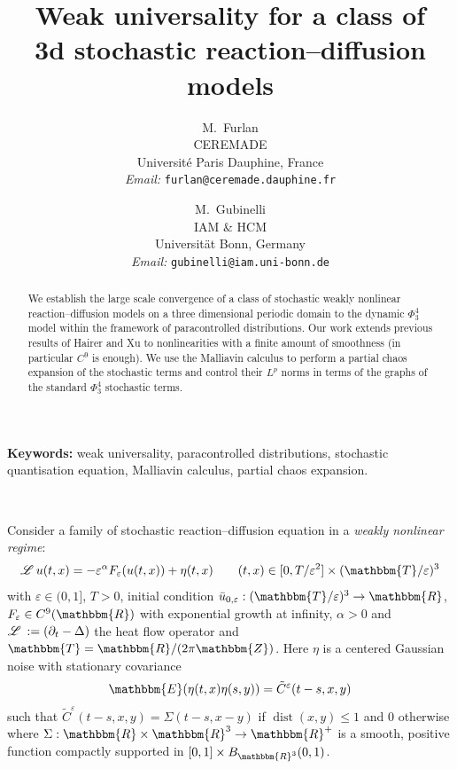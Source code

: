 \documentclass[a4paper,11pt]{article}
\newcommand{\tmaffiliation}[1]{\\ #1}
\newcommand{\tmemail}[1]{\\ \textit{Email:} \texttt{#1}}
\newcommand{\tmmathbf}[1]{\ensuremath{\boldsymbol{#1}}}
\newcommand{\tmop}[1]{\ensuremath{\operatorname{#1}}}
\newcommand{\tmtextit}[1]{{\itshape{#1}}}
\newcommand{\tmkeywords}{\textbf{Keywords:} }
\newcommand{\LL}{\mathscr{L} \hspace{.2em}}
\begin{document}
\title{
  Weak universality for a class of\\
  3d stochastic reaction--diffusion models
}

\author{
  M.~Furlan
  \tmaffiliation{CEREMADE\\
  Universit{\'e} Paris Dauphine, France}
  \tmemail{furlan@ceremade.dauphine.fr}
  \and
  M.~Gubinelli
  \tmaffiliation{IAM \& HCM\\
  Universit{\"a}t Bonn, Germany}
  \tmemail{gubinelli@iam.uni-bonn.de}
}

\maketitle

\begin{abstract}
  We establish the large scale convergence of a class of stochastic weakly
  nonlinear reaction--diffusion models on a three dimensional periodic domain
  to the dynamic $\Phi^4_3$ model within the framework of paracontrolled
  distributions. Our work extends previous results of Hairer and Xu to
  nonlinearities with a finite amount of smoothness (in particular $C^9$ is
  enough). We use the Malliavin calculus to perform a partial chaos expansion
  of the stochastic terms and control their $L^p$ norms in terms of the graphs
  of the standard $\Phi^4_3$ stochastic terms. 
\end{abstract}

\tmkeywords{weak universality, paracontrolled distributions, stochastic
quantisation equation, Malliavin calculus, partial chaos expansion.}

\

Consider a family of stochastic reaction--diffusion equation in a
\tmtextit{weakly nonlinear regime}:
\begin{equation}
  \LL u (t, x) = - \varepsilon^{\alpha} F_{\varepsilon} (u (t, x)) + \eta (t,
  x) \label{e:micro} \qquad (t, x) \in [0, T / \varepsilon^2] \times
  (\mathbbm{T}/ \varepsilon)^3
\end{equation}
with $\varepsilon \in (0, 1]$, $T > 0$, initial condition $\bar{u}_{0,
\varepsilon} : (\mathbbm{T}/ \varepsilon)^3 \tmmathbf{} \rightarrow
\mathbbm{R}$, $F_{\varepsilon} \in C^9 (\mathbbm{R})$ with exponential growth
at infinity, $\alpha > 0$ and $\LL : = (\partial_t - \Delta)$ the heat flow
operator and $\mathbbm{T}=\mathbbm{R}/ (2 \pi \mathbbm{Z})$. Here $\eta$ is a
centered Gaussian noise with stationary covariance
\[ \mathbbm{E} (\eta (t, x) \eta (s, y)) = \tilde{C}^{\varepsilon} (t - s, x,
   y) \]
such that $\tilde{C}^{\varepsilon} (t - s, x, y) = \Sigma (t - s, x - y)$ if
$\tmop{dist} (x, y) \leqslant 1$ and $0$ otherwise where $\Sigma : \mathbbm{R}
\times \mathbbm{R}^3 \rightarrow \mathbbm{R}^+$ is a smooth, positive function
compactly supported in $[0, 1] \times B_{\mathbbm{R}^3} (0, 1)$.
\end{document}

